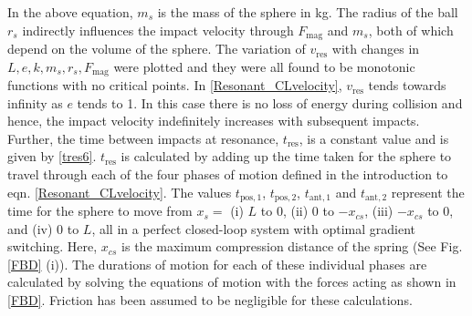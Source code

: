 \documentclass[letterpaper, 10 pt, conference]{ieeeconf}  %
\begin{document}
In the above equation, $m_s$ is the mass of the sphere in kg. The radius of the ball $r_s$ indirectly influences the impact velocity through $F_{\textrm{mag}}$ and $m_s$, both of which depend on the volume of the sphere. The variation of $v_\text{res}$ with changes in $L,e,k,m_s,r_s,F_{\textrm{mag}}$ were plotted and they were all found to be monotonic functions with no critical points. In \cref{Resonant_CLvelocity}, $v_\text{res}$ tends towards infinity as $e$ tends to 1. In this case there is no loss of energy during collision and hence, the impact velocity indefinitely increases with subsequent impacts. Further, the time between impacts at resonance, $t_\text{res}$, is a constant value and is given by \cref{tres6}. $t_\text{res}$ is calculated by adding up the time taken for the sphere to travel through each of the four phases of motion defined in the introduction to eqn. \ref{Resonant_CLvelocity}. The values $t_{\text{pos},1}$, $t_{\text{pos},2}$, $t_{\text{ant},1}$ and $t_{\text{ant},2}$ represent the time for the sphere to move from $x_s =$ (i) $L$ to 0, (ii) 0 to $-x_{cs}$, (iii) $-x_{cs}$ to 0, and (iv) 0 to $L$, all in a perfect closed-loop system with optimal gradient switching. Here, $x_{cs}$ is the maximum compression distance of the spring (See Fig. \ref{FBD} (i)). The durations of motion for each of these individual phases are calculated by solving the equations of motion with the forces acting as shown in \cref{FBD}. Friction has been assumed to be negligible for these calculations.
\end{document}
